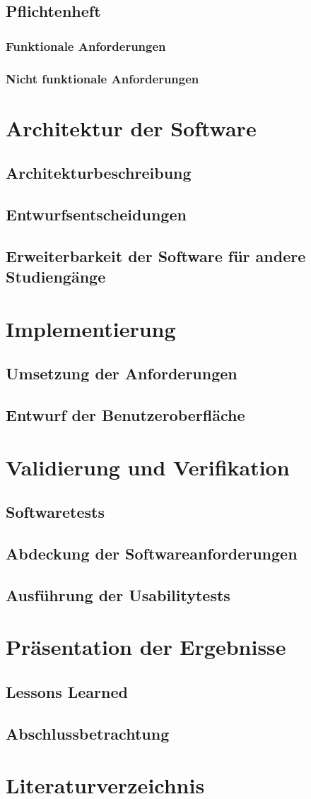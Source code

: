 \documentclass{scrreprt}
\begin{document}
\section{Pflichtenheft }
\subsection{Funktionale Anforderungen}
\subsection{Nicht funktionale Anforderungen}
\chapter{Architektur der Software}
\section{Architekturbeschreibung}
\section{Entwurfsentscheidungen}
\section{Erweiterbarkeit der Software für andere Studiengänge}
\chapter{Implementierung}
\section{Umsetzung der Anforderungen}
\section{Entwurf der Benutzeroberfläche}
\chapter{Validierung und Verifikation}
\section{Softwaretests}
\section{Abdeckung der Softwareanforderungen}
\section{Ausführung der Usabilitytests}
\chapter{Präsentation der Ergebnisse}
\section{Lessons Learned}
\section{Abschlussbetrachtung}
\chapter{Literaturverzeichnis}
\nocite{*}
\printbibliography
\end{document}
